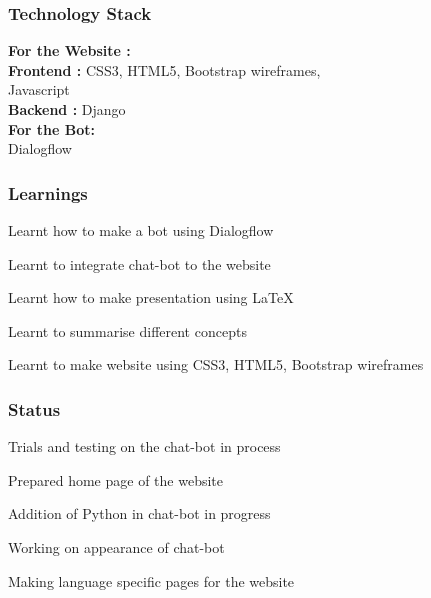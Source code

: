 \documentclass[14pt]{beamer}
\begin{document}
\begin{frame}
    \frametitle{Technology Stack}
        \textbf{For the Website :}\\
        \textbf{Frontend :} CSS3, HTML5, Bootstrap wireframes,\\
             Javascript \\
        \textbf{Backend  :} Django \\
        \textbf{For the Bot:} \\
              Dialogflow \\
\end{frame}

\begin{frame}
    \frametitle{Learnings}
    \item Learnt how to make a bot using Dialogflow \\
    \item Learnt to integrate chat-bot to the website \\
    \item Learnt how to make presentation using LaTeX \\
    \item Learnt to summarise different concepts \\
    \item Learnt to make website using CSS3, HTML5, Bootstrap wireframes \\
\end{frame}

\begin{frame}
    \frametitle{Status}
    \item Trials and testing on the chat-bot in process \\
    \item Prepared home page of the website \\
    \item Addition of Python in chat-bot in progress \\  
    \item Working on appearance of chat-bot \\
    \item Making language specific pages for the website \\
\end{frame}
    
\end{document}
